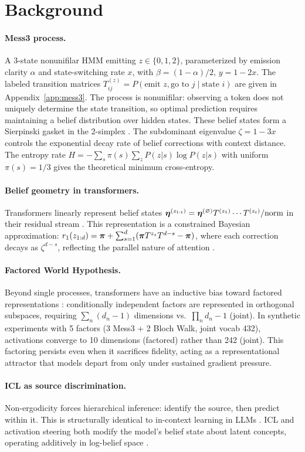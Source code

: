 \section{Background}

\paragraph{Mess3 process.} A 3-state nonunifilar HMM emitting $z \in \{0,1,2\}$, parameterized by emission clarity $\alpha$ and state-switching rate $x$, with $\beta=(1{-}\alpha)/2$, $y=1{-}2x$. The labeled transition matrices $T^{(z)}_{ij} = P(\text{emit } z, \text{go to } j \mid \text{state } i)$ are given in Appendix~\ref{app:mess3}. The process is nonunifilar: observing a token does not uniquely determine the state transition, so optimal prediction requires maintaining a belief distribution over hidden states. These belief states form a Sierpinski gasket in the 2-simplex \cite{riechers2018spectral}. The subdominant eigenvalue $\zeta = 1{-}3x$ controls the exponential decay rate of belief corrections with context distance. The entropy rate $H = -\sum_s \pi(s) \sum_z P(z|s) \log P(z|s)$ with uniform $\pi(s) = 1/3$ gives the theoretical minimum cross-entropy.

\paragraph{Belief geometry in transformers.} Transformers linearly represent belief states $\bm{\eta}^{(z_{1:t})} = \bm{\eta}^{(\varnothing)} T^{(z_1)} \cdots T^{(z_t)} / \text{norm}$ in their residual stream \cite{shai2024transformers}. This representation is a constrained Bayesian approximation: $r_1(z_{1:d}) = \bm{\pi} + \sum_{s=1}^{d} (\bm{\pi} T^{z_s} T^{d-s} - \bm{\pi})$, where each correction decays as $\zeta^{d-s}$, reflecting the parallel nature of attention \cite{piotrowski2025constrained}.

\paragraph{Factored World Hypothesis.} Beyond single processes, transformers have an inductive bias toward factored representations \cite{shai2026factored}: conditionally independent factors are represented in orthogonal subspaces, requiring $\sum_n (d_n {-} 1)$ dimensions vs.\ $\prod_n d_n {-} 1$ (joint). In synthetic experiments with 5 factors (3 Mess3 + 2 Bloch Walk, joint vocab 432), activations converge to 10 dimensions (factored) rather than 242 (joint). This factoring persists even when it sacrifices fidelity, acting as a representational attractor that models depart from only under sustained gradient pressure.

\paragraph{ICL as source discrimination.} Non-ergodicity forces hierarchical inference: identify the source, then predict within it. This is structurally identical to in-context learning in LLMs \cite{shai2026factored}. ICL and activation steering both modify the model's belief state about latent concepts, operating additively in log-belief space \cite{bigelow2025belief}.
